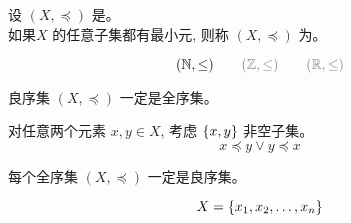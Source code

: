 
\begin{frame}{}
  \begin{definition}
    设 $(X, \preceq)$ 是。 \\[5pt]
    如果$X$ 的任意子集都有最小元, 则称 $(X, \preceq)$ 为。
  \end{definition}

  \pause
  \[
    (\N, \le) \qquad \gray{(\Z, \le)} \qquad \gray{(\R, \le)}
  \]

  \pause
  \vspace{0.30cm}
  \begin{center}
  \end{center}

  \pause
  \begin{theorem}
    良序集 $(X, \preceq)$ 一定是全序集。
  \end{theorem}

  \pause
  \vspace{0.30cm}
  \begin{center}
    对任意两个元素 $x, y \in X$, 考虑 $\{x, y\}$ 非空子集。
    \pause
    \[
      x \preceq y \lor y \preceq x
    \]
  \end{center}
\end{frame}

\begin{frame}{}
  \begin{theorem}
    每个全序集 $(X, \preceq)$ 一定是良序集。
  \end{theorem}

  \pause
  \[
    X = \{x_{1}, x_{2}, \dots, x_{n}\}
  \]
  \pause
  \begin{center}
     \pause \\[15pt]
     \pause \\[15pt]
  \end{center}
\end{frame}
